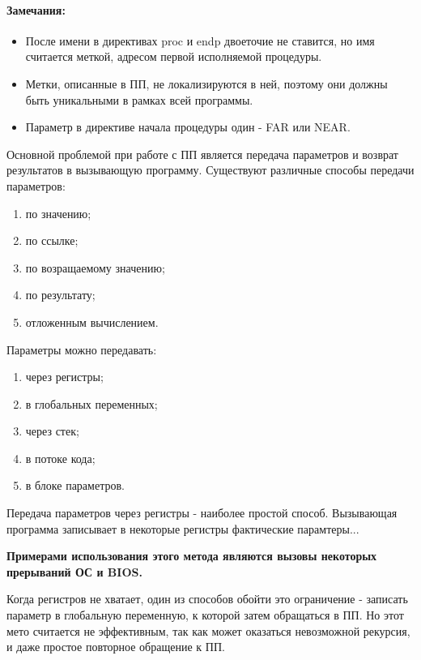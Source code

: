 \paragraph{Замечания:}

\begin{itemize}
    \item После имени в директивах proc и endp двоеточие не ставится, но имя считается меткой, адресом первой исполняемой процедуры.
    \item Метки, описанные в ПП, не локализируются в ней, поэтому они должны быть уникальными в рамках всей программы.
    \item Параметр в директиве начала процедуры один - FAR или NEAR.
\end{itemize}

Основной проблемой при работе с ПП является передача параметров и возврат результатов в вызывающую программу.
Существуют различные способы передачи параметров:
\begin{enumerate}
    \item по значению;
    \item по ссылке;
    \item по возращаемому значению;
    \item по результату;
    \item отложенным вычислением.
\end{enumerate}

Параметры можно передавать:
\begin{enumerate}
    \item через регистры;
    \item в глобальных переменных;
    \item через стек;
    \item в потоке кода;
    \item в блоке параметров.
\end{enumerate}

Передача параметров через регистры - наиболее простой способ. Вызывающая программа записывает в некоторые регистры фактические парамтеры...

\textbf{Примерами использования этого метода являются вызовы некоторых прерываний ОС и BIOS.}

Когда регистров не хватает, один из способов обойти это ограничение - записать параметр в глобальную переменную, к которой затем обращаться в ПП.
Но этот мето считается не эффективным, так как может оказаться невозможной рекурсия, и даже простое повторное обращение к ПП.

